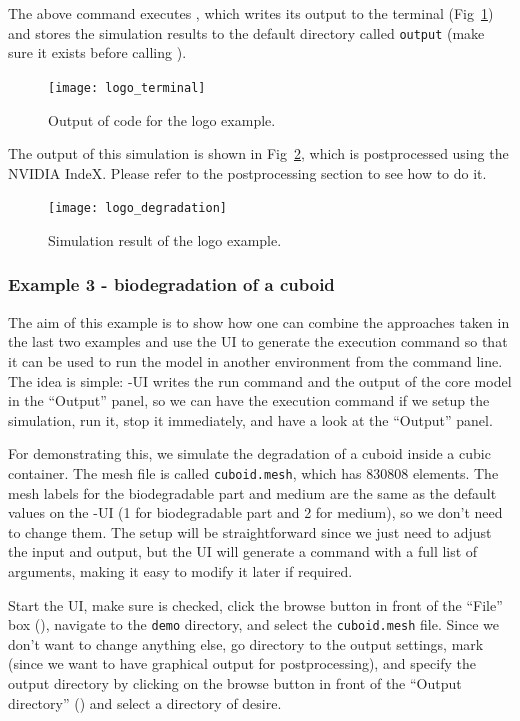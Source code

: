 The above command executes \biodeg{}, which writes its output to the terminal (Fig~\ref{fig:logo_terminal}) and stores the simulation results to the default directory called \verb|output| (make sure it exists before calling \biodeg{}).

\begin{figure}[h]
\center \texttt{[image: logo\_terminal]}
\caption{Output of \biodeg{} code for the logo example.} \label{fig:logo_terminal}
\end{figure}

The output of this simulation is shown in Fig~\ref{fig:logo_degradation}, which is postprocessed using the NVIDIA IndeX. Please refer to the postprocessing section to see how to do it.

\begin{figure}[h]
\center \texttt{[image: logo\_degradation]}
\caption{Simulation result of the logo example.} \label{fig:logo_degradation}
\end{figure}

\subsubsection{Example 3 - biodegradation of a cuboid}\label{sec:example3}

The aim of this example is to show how one can combine the approaches taken in the last two examples and use the UI to generate the execution command so that it can be used to run the model in another environment from the command line. The idea is simple: \biodeg{}-UI writes the run command and the output of the core model in the ``Output'' panel, so we can have the execution command if we setup the simulation, run it, stop it immediately, and have a look at the ``Output'' panel.

For demonstrating this, we simulate the degradation of a cuboid inside a cubic container. The mesh file is called \verb|cuboid.mesh|, which has $\num{830808}$ elements. The mesh labels for the biodegradable part and medium are the same as the default values on the \biodeg{}-UI (1 for biodegradable part and 2 for medium), so we don't need to change them. The setup will be straightforward since we just need to adjust the input and output, but the UI will generate a command with a full list of arguments, making it easy to modify it later if required.

Start the UI,
make sure  is checked, click the browse button in front of the ``File'' box (), navigate to the \verb|demo| directory, and select the \verb|cuboid.mesh| file. Since we don't want to change anything else, go directory to the output settings, mark
  (since we want to have graphical output for postprocessing), and specify the output directory by clicking on the browse button in front of the ``Output directory'' () and select a directory of desire.

